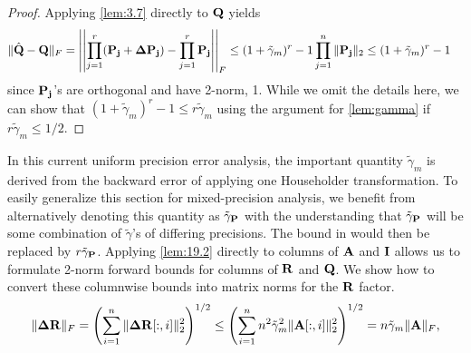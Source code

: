 \begin{proof}
	Applying \cref{lem:3.7} directly to $\mathbf{Q}$ yields
	\begin{align*}
		\|\hat{\mathbf{Q}}-\mathbf{Q}\|_F &= \left|\left|\prod_{j=1}^r (\mathbf{P_j} + \mathbf{\Delta P_j})- \prod_{j=1}^r\mathbf{P_j} \right|\right|_F\leq(1+\tilde{\gamma}_m)^r-1\prod_{j=1}^n\|\mathbf{P_j}\|_2 \leq (1+\tilde{\gamma}_m)^r-1
	\end{align*}
	since $\mathbf{P_j}$'s are orthogonal and have 2-norm, 1.
	While we omit the details here, we can show that $(1+\tilde{\gamma}_m)^r-1 \leq r\tilde{\gamma}_m$ using the argument for \cref{lem:gamma} if $r\tilde{\gamma}_m \leq 1/2$.
\end{proof}
In this current uniform precision error analysis, the important quantity $\tilde{\gamma}_{m}$ is derived from the backward error of applying one Householder transformation.
To easily generalize this section for mixed-precision analysis, we benefit from alternatively denoting this quantity as $\tilde{\gamma}_{\mathbf{P}}$ with the understanding that $\tilde{\gamma}_{\mathbf{P}}$ will be some combination of $\tilde{\gamma}$'s of differing precisions. 
The bound in  would then be  replaced by $r\tilde{\gamma}_{\mathbf{P}}$.
Applying \cref{lem:19.2} directly to columns of $\mathbf{A}$ and $\mathbf{I}$ allows us to formulate 2-norm forward bounds for columns of $\mathbf{R}$ and $\mathbf{Q}$.
We show how to convert these columnwise bounds into matrix norms for the $\mathbf{R}$ factor.
\begin{align*}
	\|\mathbf{\Delta R} \|_F &= \left(\sum_{i=1}^n \|\mathbf{\Delta R}[:,i]\|_2^2\right)^{1/2} \leq \left(\sum_{i=1}^n n^2\tilde{\gamma}_{m}^2 \|\mathbf{A}[:,i]\|_2^2\right)^{1/2} = n\tilde{\gamma}_{m} \|\mathbf{A}\|_F, \\
\end{align*}
